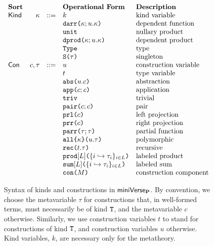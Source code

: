 \begin{figure}[p] 
\[\begin{array}{lrlllll}
\textbf{Sort} & & & \textbf{Operational Form} 
& \textbf{Description}\\
\mathsf{Kind} & \kappa & ::= & k & \text{kind variable}\\
&&& \texttt{darr}\texttt{(}\kappa; u.\kappa\texttt{)} 
& \text{dependent function}\\
&&& \texttt{unit} 
& \text{nullary product}\\
&&& \texttt{dprod}\texttt{(}\kappa; u.\kappa\texttt{)} 
& \text{dependent product}\\
&&& \texttt{Type} 
& \text{type}\\
&&& \texttt{S}\texttt{(}\tau\texttt{)} 
& \text{singleton}\\
\mathsf{Con} & c, \tau & ::= & u 
& \text{construction variable}\\
&&& t 
& \text{type variable}
\\
&&& \texttt{abs}\texttt{(}u.c\texttt{)} 
& \text{abstraction}\\
&&& \texttt{app}\texttt{(}c; c\texttt{)} 
& \text{application}\\
&&& \texttt{triv} 
& \text{trivial}\\
&&& \texttt{pair}\texttt{(}c; c\texttt{)}
& \text{pair}\\
&&& \texttt{prl}\texttt{(}c\texttt{)} 
& \text{left projection}\\
&&& \texttt{prr}\texttt{(}c\texttt{)} 
& \text{right projection}\\
&&& \texttt{parr}\texttt{(}\tau; \tau\texttt{)} 
& \text{partial function}\\
&&& \texttt{all}\texttt{\{}\kappa\texttt{\}(}u.\tau\texttt{)} 
& \text{polymorphic}\\
&&& \texttt{rec}\texttt{(}t.\tau\texttt{)} 
& \text{recursive}\\
&&& \texttt{prod}[L]\texttt{(}\{i \hookrightarrow \tau_{i}\}_{i \in L}\texttt{)} 
& \text{labeled product}\\
&&& \texttt{sum}[L]\texttt{(}\{i \hookrightarrow \tau_{i}\}_{i \in L}\texttt{)} 
& \text{labeled sum}\\
&&& \texttt{con}\texttt{(}M\texttt{)} 
& \text{construction component}
\end{array}\]
\caption[Syntax of kinds and constructions in $\miniVerseParam$]{Syntax of kinds and constructions in $\miniVerseParam$. By convention, we choose the metavariable $\tau$ for constructions that, in well-formed terms, must necessarily be of kind $\texttt{T}$, and the metavariable $c$ otherwise. Similarly, we use construction variables $t$ to stand for constructions of kind $\texttt{T}$, and construction variables $u$ otherwise. Kind variables, $k$, are necessary only for the metatheory.}
\label{fig:P-kinds-constructors}
\end{figure}

